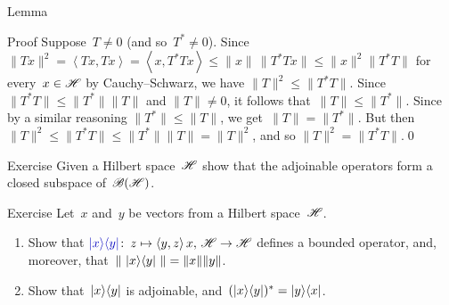\documentclass[a]{subfiles}
\begin{document}
\begin{parsec}[hilb]
\begin{point}{Lemma}
\begin{point}{Proof}
Suppose~$T\neq 0$ (and so~$T^*\neq 0$).
Since $\|Tx\|^2=\left<Tx,Tx\right>=\left<x,T^*Tx\right>
\leq \|x\|\,\|T^*Tx\|\leq \|x\|^2\|T^*T\|$
for every~$x\in \mathscr{H}$
by Cauchy--Schwarz,
we have $\|T\|^2\leq \|T^*T\|$.
Since~$\|T^*T\|\leq \|T^*\|\|T\|$
and $\|T\|\neq 0$,
it follows that~$\|T\|\leq \|T^*\|$.
Since by a similar reasoning $\|T^*\|\leq \|T\|$,
we get~$\|T\|=\|T^*\|$.
But then $\|T\|^2\leq \|T^*T\|\leq \|T^*\|\|T\|=\|T\|^2$,
and so $\|T\|^2=\|T^*T\|$.\qed
\end{point}
\end{point}
\begin{point}{Exercise}%
Given a Hilbert space~$\mathscr{H}$
show that the adjoinable operators
form a closed subspace of~$\mathscr{B}(\mathscr{H})$.
\end{point}
\begin{point}[ketbra]{Exercise}%
Let~$x$ and~$y$ be vectors from a Hilbert space~$\mathscr{H}$.
\begin{enumerate}
\item
Show that $\Define{\ketbra{x}{y}}\colon\, z\mapsto\left<y,z\right>x,\,
\scrH\to\scrH$%
defines a bounded operator,
and, moreover, that~$\|\,\left|x\right>\!\left<y\right|\,\|=\|x\|\|y\|$.
\item
Show that~$\left|x\right>\!\left<y\right|$
is adjoinable,
and~$(\left|x\right>\!\left<y\right|)^*=\left|y\right>\!\left<x\right|$.
\end{enumerate}
\end{point}
\end{parsec}
\end{document}
